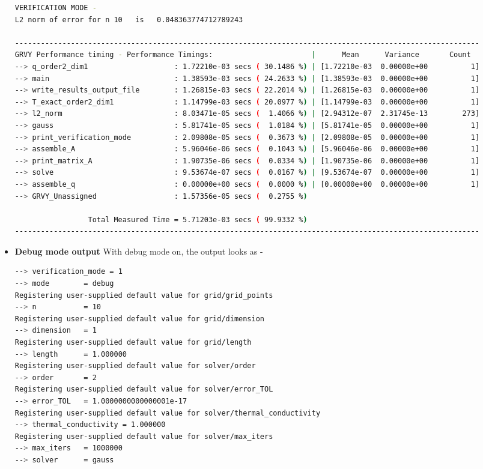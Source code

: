 \documentclass[12 pt, final]{article}
\begin{document}
\begin{itemize}
\begin{lstlisting}[language = bash, basicstyle=\tiny]
VERIFICATION MODE -
L2 norm of error for n 10   is   0.048363774712789243

------------------------------------------------------------------------------------------------------------
GRVY Performance timing - Performance Timings:                       |      Mean      Variance       Count
--> q_order2_dim1                    : 1.72210e-03 secs ( 30.1486 %) | [1.72210e-03  0.00000e+00          1]
--> main                             : 1.38593e-03 secs ( 24.2633 %) | [1.38593e-03  0.00000e+00          1]
--> write_results_output_file        : 1.26815e-03 secs ( 22.2014 %) | [1.26815e-03  0.00000e+00          1]
--> T_exact_order2_dim1              : 1.14799e-03 secs ( 20.0977 %) | [1.14799e-03  0.00000e+00          1]
--> l2_norm                          : 8.03471e-05 secs (  1.4066 %) | [2.94312e-07  2.31745e-13        273]
--> gauss                            : 5.81741e-05 secs (  1.0184 %) | [5.81741e-05  0.00000e+00          1]
--> print_verification_mode          : 2.09808e-05 secs (  0.3673 %) | [2.09808e-05  0.00000e+00          1]
--> assemble_A                       : 5.96046e-06 secs (  0.1043 %) | [5.96046e-06  0.00000e+00          1]
--> print_matrix_A                   : 1.90735e-06 secs (  0.0334 %) | [1.90735e-06  0.00000e+00          1]
--> solve                            : 9.53674e-07 secs (  0.0167 %) | [9.53674e-07  0.00000e+00          1]
--> assemble_q                       : 0.00000e+00 secs (  0.0000 %) | [0.00000e+00  0.00000e+00          1]
--> GRVY_Unassigned                  : 1.57356e-05 secs (  0.2755 %)

                 Total Measured Time = 5.71203e-03 secs ( 99.9332 %)
------------------------------------------------------------------------------------------------------------
    \end{lstlisting}
    
\item \textbf{Debug mode output}
With debug mode on, the output looks as - 
\begin{lstlisting}[language = bash, basicstyle=\tiny]
--> verification_mode = 1
--> mode        = debug
Registering user-supplied default value for grid/grid_points
--> n           = 10
Registering user-supplied default value for grid/dimension
--> dimension   = 1
Registering user-supplied default value for grid/length
--> length      = 1.000000
Registering user-supplied default value for solver/order
--> order       = 2
Registering user-supplied default value for solver/error_TOL
--> error_TOL   = 1.0000000000000001e-17
Registering user-supplied default value for solver/thermal_conductivity
--> thermal_conductivity = 1.000000
Registering user-supplied default value for solver/max_iters
--> max_iters   = 1000000
--> solver      = gauss


\end{lstlisting}
\end{itemize}
\end{document}
